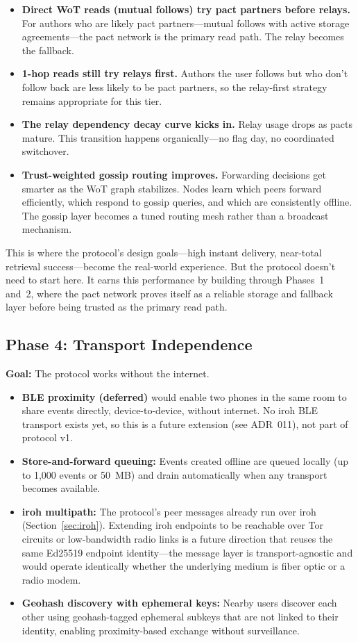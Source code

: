 \documentclass[11pt,a4paper]{article}
\begin{document}
\begin{itemize}
  \item \textbf{Direct WoT reads (mutual follows) try pact partners before relays.} For authors who are likely pact partners---mutual follows with active storage agreements---the pact network is the primary read path. The relay becomes the fallback.
  \item \textbf{1-hop reads still try relays first.} Authors the user follows but who don't follow back are less likely to be pact partners, so the relay-first strategy remains appropriate for this tier.
  \item \textbf{The relay dependency decay curve kicks in.} Relay usage drops as pacts mature. This transition happens organically---no flag day, no coordinated switchover.
  \item \textbf{Trust-weighted gossip routing improves.} Forwarding decisions get smarter as the WoT graph stabilizes. Nodes learn which peers forward efficiently, which respond to gossip queries, and which are consistently offline. The gossip layer becomes a tuned routing mesh rather than a broadcast mechanism.
\end{itemize}

This is where the protocol's design goals---high instant delivery, near-total retrieval success---become the real-world experience. But the protocol doesn't need to start here. It earns this performance by building through Phases~1 and~2, where the pact network proves itself as a reliable storage and fallback layer before being trusted as the primary read path.

\subsection{Phase 4: Transport Independence}

\textbf{Goal:} The protocol works without the internet.

\begin{itemize}
  \item \textbf{BLE proximity (deferred)} would enable two phones in the same room to share events directly, device-to-device, without internet. No iroh BLE transport exists yet, so this is a future extension (see ADR~011), not part of protocol v1.
  \item \textbf{Store-and-forward queuing:} Events created offline are queued locally (up to 1,000 events or 50~MB) and drain automatically when any transport becomes available.
  \item \textbf{iroh multipath:} The protocol's peer messages already run over iroh (Section~\ref{sec:iroh}). Extending iroh endpoints to be reachable over Tor circuits or low-bandwidth radio links is a future direction that reuses the same Ed25519 endpoint identity---the message layer is transport-agnostic and would operate identically whether the underlying medium is fiber optic or a radio modem.
  \item \textbf{Geohash discovery with ephemeral keys:} Nearby users discover each other using geohash-tagged ephemeral subkeys that are not linked to their identity, enabling proximity-based exchange without surveillance.
\end{itemize}
\end{document}
